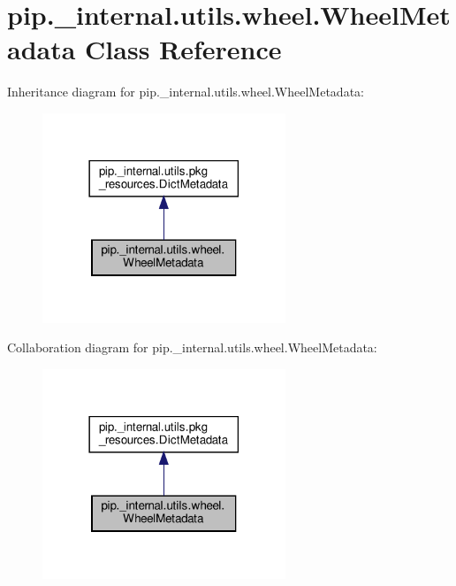 \hypertarget{classpip_1_1__internal_1_1utils_1_1wheel_1_1WheelMetadata}{}\section{pip.\+\_\+internal.\+utils.\+wheel.\+Wheel\+Metadata Class Reference}
\label{classpip_1_1__internal_1_1utils_1_1wheel_1_1WheelMetadata}


Inheritance diagram for pip.\+\_\+internal.\+utils.\+wheel.\+Wheel\+Metadata\+:
\nopagebreak
\begin{figure}[H]
\begin{center}
\leavevmode
\includegraphics[width=206pt]{classpip_1_1__internal_1_1utils_1_1wheel_1_1WheelMetadata__inherit__graph}
\end{center}
\end{figure}


Collaboration diagram for pip.\+\_\+internal.\+utils.\+wheel.\+Wheel\+Metadata\+:
\nopagebreak
\begin{figure}[H]
\begin{center}
\leavevmode
\includegraphics[width=206pt]{classpip_1_1__internal_1_1utils_1_1wheel_1_1WheelMetadata__coll__graph}
\end{center}
\end{figure}
